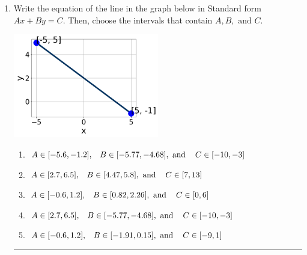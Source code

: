 \documentclass[14pt]{extbook}
\newcommand{\litem}[1]{\item#1\hspace*{-1cm}\rule{\textwidth}{0.4pt}}
\begin{document}
\begin{enumerate}
{\begin{enumerate}[label=\Alph*.]
\end{enumerate} }
\litem{
Write the equation of the line in the graph below in Standard form $Ax+By=C$. Then, choose the intervals that contain $A, B, \text{ and } C$.
\begin{center}
    \includegraphics[width=0.5\textwidth]{../Figures/linearGraphToStandardCopyA.png}
\end{center}
\begin{enumerate}[label=\Alph*.]
\item \( A \in [-5.6, -1.2], \hspace{3mm} B \in [-5.77, -4.68], \text{ and } \hspace{3mm} C \in [-10, -3] \)
\item \( A \in [2.7, 6.5], \hspace{3mm} B \in [4.47, 5.8], \text{ and } \hspace{3mm} C \in [7, 13] \)
\item \( A \in [-0.6, 1.2], \hspace{3mm} B \in [0.82, 2.26], \text{ and } \hspace{3mm} C \in [0, 6] \)
\item \( A \in [2.7, 6.5], \hspace{3mm} B \in [-5.77, -4.68], \text{ and } \hspace{3mm} C \in [-10, -3] \)
\item \( A \in [-0.6, 1.2], \hspace{3mm} B \in [-1.91, 0.15], \text{ and } \hspace{3mm} C \in [-9, 1] \)


\end{enumerate}}
\end{enumerate}
\end{document}

